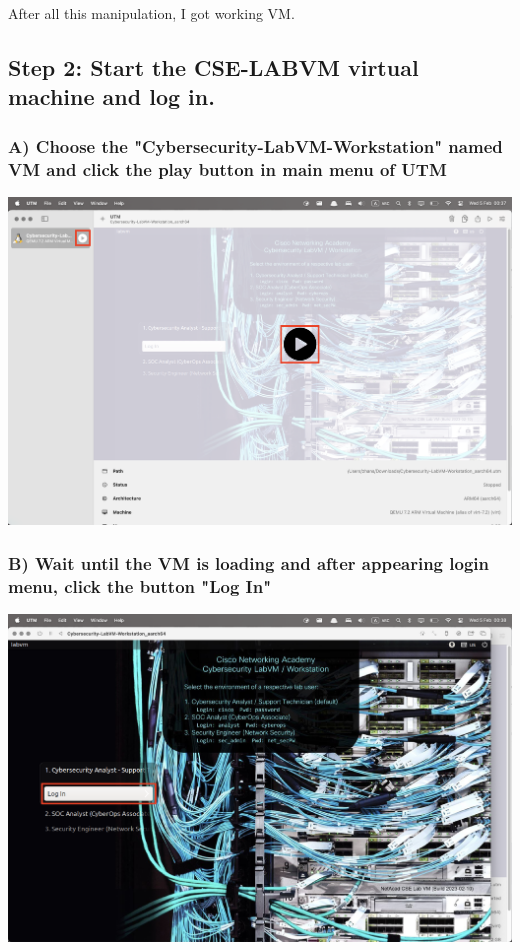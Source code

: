 \documentclass{article}
\begin{document}
\vspace{2\baselineskip}

After all this manipulation, I got working VM.

\newpage
\subsection*{Step 2: Start the CSE-LABVM virtual machine and log in.}

\subsubsection*{A) Choose the "Cybersecurity-LabVM-Workstation" named VM and click the play button in main menu of UTM}
\includegraphics[width=1\textwidth]{Part2/Step2/1.png}

\subsubsection*{B) Wait until the VM is loading and after appearing login menu, click the button "Log In"}
\includegraphics[width=1\textwidth]{Part2/Step2/2.png}
\end{document}

